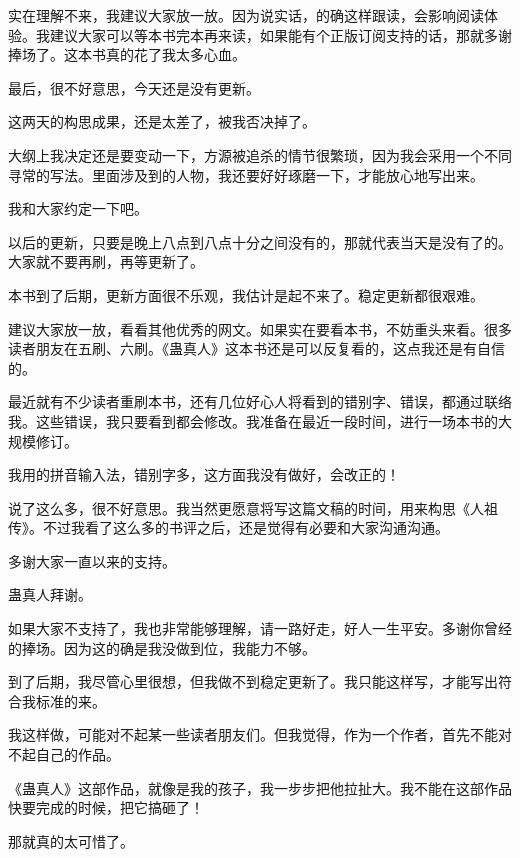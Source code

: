 \begin{this_body}
实在理解不来，我建议大家放一放。因为说实话，的确这样跟读，会影响阅读体验。我建议大家可以等本书完本再来读，如果能有个正版订阅支持的话，那就多谢捧场了。这本书真的花了我太多心血。

最后，很不好意思，今天还是没有更新。

这两天的构思成果，还是太差了，被我否决掉了。

大纲上我决定还是要变动一下，方源被追杀的情节很繁琐，因为我会采用一个不同寻常的写法。里面涉及到的人物，我还要好好琢磨一下，才能放心地写出来。

我和大家约定一下吧。

以后的更新，只要是晚上八点到八点十分之间没有的，那就代表当天是没有了的。大家就不要再刷，再等更新了。

本书到了后期，更新方面很不乐观，我估计是起不来了。稳定更新都很艰难。

建议大家放一放，看看其他优秀的网文。如果实在要看本书，不妨重头来看。很多读者朋友在五刷、六刷。《蛊真人》这本书还是可以反复看的，这点我还是有自信的。

最近就有不少读者重刷本书，还有几位好心人将看到的错别字、错误，都通过联络我。这些错误，我只要看到都会修改。我准备在最近一段时间，进行一场本书的大规模修订。

我用的拼音输入法，错别字多，这方面我没有做好，会改正的！

说了这么多，很不好意思。我当然更愿意将写这篇文稿的时间，用来构思《人祖传》。不过我看了这么多的书评之后，还是觉得有必要和大家沟通沟通。

多谢大家一直以来的支持。

蛊真人拜谢。

如果大家不支持了，我也非常能够理解，请一路好走，好人一生平安。多谢你曾经的捧场。因为这的确是我没做到位，我能力不够。

到了后期，我尽管心里很想，但我做不到稳定更新了。我只能这样写，才能写出符合我标准的来。

我这样做，可能对不起某一些读者朋友们。但我觉得，作为一个作者，首先不能对不起自己的作品。

《蛊真人》这部作品，就像是我的孩子，我一步步把他拉扯大。我不能在这部作品快要完成的时候，把它搞砸了！

那就真的太可惜了。

\end{this_body}


